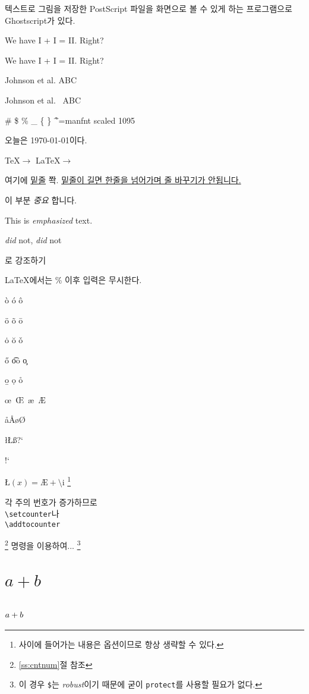 \documentclass[11pt]{article}
\begin{document}
텍스트로 그림을 저장한 PostScript 파일을 화면으로 볼 수 있게 하는 프로그램으로  Ghostscript가 있다.

We have I + I = II. Right?

We have I + I = II\@. Right?

Johnson et al. ABC

Johnson et al. \ ABC

\# \$ \% \_ \{ \} \~ \^

\font \myfont=manfnt scaled 1095
{\myfont {}   %
    } \space \space
 
{\myfont {}   %
   }

{\myfont {}}{\myfont {}}{\myfont {}}%
{\myfont {}}{\myfont {}}{\myfont {}}%
{\myfont {}}{\myfont {}}

오늘은 \today 이다.

\TeX $\rightarrow$ \LaTeX $\rightarrow$ \LaTeXe

여기에 \underline{밑줄} 쫙. \underline{밑줄이 길면 한줄을 넘어가며 줄 바꾸기가 안됩니다.}

이 부분 \emph{중요} 합니다.

This is \emph{emphasized} text.

\emph{did} not, \emph{did\/} not

로 강조하기

\LaTeX 에서는 \% 이후 %
입력은 무시한다. %

\`{o} \'{o} \^{o} 

\"{o} \~{o} \={o}

\.{o} \u{o} \v{o}

\H{o} \t{oo} \c{o}

\b{o} \d{o} \r{o}

\oe \  \OE \  \ae \  \AE

\aa \AA \o \O

\l \L \ss ?`

!`

$\mbox{\L}(x) = \mbox{\AE} + \mbox{\^\i}$ \footnote{ 사이에 들어가는 내용은 옵션이므로 항상 생략할 수 있다.}

각 주의 번호가 증가하므로 \\
\verb+\setcounter+\footnotemark 나 \\
\verb+\addtocounter+\addtocounter{footnote}{-1}\footnote{\ref{ss:cntnum}절 참조}
명령을 이용하여... \footnote{이 경우 \texttt{\$}는 \emph{robust}이기 때문에 굳이 \texttt{protect}를 사용할 필요가 없다.}

\section{ \( a+b \) }

\section{ \protect\( a+b \protect\)}
\end{document}

